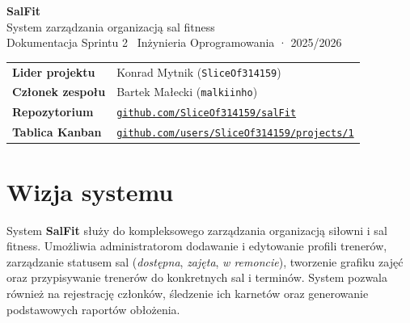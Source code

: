 \documentclass[11pt, a4paper]{article}
\begin{document}
\thispagestyle{empty}


\vspace*{0.6cm}
{\color{white}\fontsize{36}{42}\selectfont\bfseries SalFit}\\[6pt]
{\color{accent!80}\large System zarządzania organizacją sal fitness}\\[4pt]
{\color{white!70}\small Dokumentacja Sprintu 2 \textbar\ Inżynieria Oprogramowania · 2025/2026}

\vspace{3.2cm}

\begin{tcolorbox}[infobox, title={}]
\begin{tabularx}{\linewidth}{@{}lX@{}}
  \textbf{Lider projektu}   & Konrad Mytnik (\texttt{SliceOf314159}) \\[3pt]
  \textbf{Członek zespołu}  & Bartek Małecki (\texttt{malkiinho}) \\[3pt]
  \textbf{Repozytorium}     & \href{https://github.com/SliceOf314159/salFit}{\texttt{github.com/SliceOf314159/salFit}} \\[3pt]
  \textbf{Tablica Kanban}   & \href{https://github.com/users/SliceOf314159/projects/1}{\texttt{github.com/users/SliceOf314159/projects/1}} \\
\end{tabularx}
\end{tcolorbox}

\newpage

\section{Wizja systemu}

System \textbf{SalFit} służy do kompleksowego zarządzania organizacją siłowni i sal fitness.
Umożliwia administratorom dodawanie i edytowanie profili trenerów, zarządzanie statusem sal
(\emph{dostępna}, \emph{zajęta}, \emph{w remoncie}), tworzenie grafiku zajęć oraz przypisywanie
trenerów do konkretnych sal i terminów. System pozwala również na rejestrację członków,
śledzenie ich karnetów oraz generowanie podstawowych raportów obłożenia.
\end{document}
